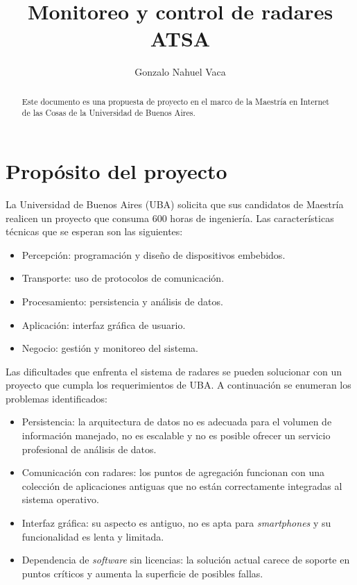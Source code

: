 \documentclass[
12pt,
spanish,
singlespacing,
parskip,
headsepline,]{article}
\title{Monitoreo y control de radares ATSA}
\author{Gonzalo Nahuel Vaca}
\begin{document}
\maketitle

\begin{abstract}

Este documento es una propuesta de proyecto en el marco de la Maestría en Internet de las Cosas de la Universidad de Buenos Aires.

\end{abstract}

\newpage

\tableofcontents

\newpage

\section{Propósito del proyecto}

La Universidad de Buenos Aires (UBA) solicita que sus candidatos de Maestría realicen un proyecto que consuma 600 horas de ingeniería.
Las características técnicas que se esperan son las siguientes:

\begin{itemize}
	\item Percepción: programación y diseño de dispositivos embebidos.
	\item Transporte: uso de protocolos de comunicación.
	\item Procesamiento: persistencia y análisis de datos.
	\item Aplicación: interfaz gráfica de usuario.
	\item Negocio: gestión y monitoreo del sistema.
\end{itemize}

Las dificultades que enfrenta el sistema de radares se pueden solucionar con un proyecto que cumpla los requerimientos de UBA.
A continuación se enumeran los problemas identificados:

\begin{itemize}
	\item Persistencia: la arquitectura de datos no es adecuada para el volumen de información manejado, no es escalable y no es posible ofrecer un servicio profesional de análisis de datos.
	\item Comunicación con radares: los puntos de agregación funcionan con una colección de aplicaciones antiguas que no están correctamente integradas al sistema operativo.
	\item Interfaz gráfica: su aspecto es antiguo, no es apta para \emph{smartphones} y su funcionalidad es lenta y limitada.
	\item Dependencia de \emph{software} sin licencias: la solución actual carece de soporte en puntos críticos y aumenta la superficie de posibles fallas.
\end{itemize}
\end{document}
